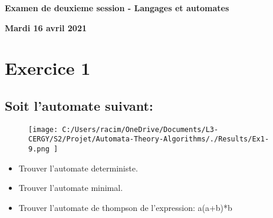 \documentclass{article}%
\begin{document}
%
\normalsize%
\pagestyle{header}%
\begin{minipage}{\textwidth}%
\centering%
\begin{Large}%
\textbf{Examen de deuxieme session {-} Langages et automates}%
\end{Large}%
\linebreak%
\begin{large}%
\textbf{Mardi 16 avril 2021}%
\end{large}%
\end{minipage}%
\section{Exercice 1}%
\label{sec:Exercice1}%
\subsection{Soit l'automate suivant:}%
\label{subsec:Soitlautomatesuivant}%


\begin{figure}[h!]%
\centering%
\texttt{[image: C:/Users/racim/OneDrive/Documents/L3-CERGY/S2/Projet/Automata-Theory-Algorithms/./Results/Ex1-9.png ]}%
\end{figure}

%
\begin{itemize}%
\item%
Trouver l'automate deterministe.%
\item%
Trouver l'automate minimal.%
\item%
Trouver l'automate de thompson de l'expression: a(a+b)*b%
\end{itemize}

%
\end{document}
